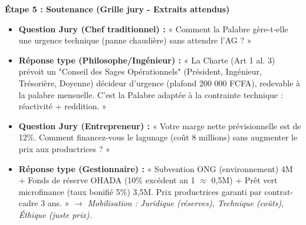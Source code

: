 \documentclass[11pt]{article}
\begin{document}
\begin{exoresolu}
\textbf{Étape 5 : Soutenance (Grille jury - Extraits attendus)}
\begin{itemize}
    \item \textbf{Question Jury (Chef traditionnel) :} « Comment la Palabre gère-t-elle une urgence technique (panne chaudière) sans attendre l'AG ? »
    \item \textbf{Réponse type (Philosophe/Ingénieur) :} « La Charte (Art 1 al. 3) prévoit un "Conseil des Sages Opérationnels" (Président, Ingénieur, Trésorière, Doyenne) décideur d'urgence (plafond 200 000 FCFA), redevable à la palabre mensuelle. C'est la Palabre adaptée à la contrainte technique : réactivité + reddition. »
    \item \textbf{Question Jury (Entrepreneur) :} « Votre marge nette prévisionnelle est de 12\%. Comment financez-vous le lagunage (coût 8 millions) sans augmenter le prix aux productrices ? »
    \item \textbf{Réponse type (Gestionnaire) :} « Subvention ONG (environnement) 4M + Fonds de réserve OHADA (10\% excédent an 1 $\approx$ 0,5M) + Prêt vert microfinance (taux bonifié 5\%) 3,5M. Prix productrices garanti par contrat-cadre 3 ans. » $\rightarrow$ \textit{Mobilisation : Juridique (réserves), Technique (coûts), Éthique (juste prix).}
\end{itemize}
\end{exoresolu}
\end{document}
